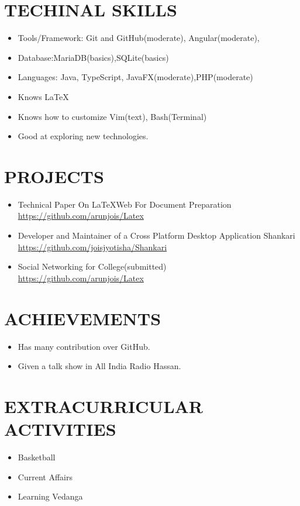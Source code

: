 \documentclass{res}
\begin{document}
\begin{resume}
		\section{TECHINAL SKILLS}
		\begin{itemize}
			\item Tools/Framework: Git and GitHub(moderate),  Angular(moderate),
			\item Database:MariaDB(basics),SQLite(basics)
			\item Languages: Java, TypeScript, JavaFX(moderate),PHP(moderate) 
			\item Knows \LaTeX
			\item Knows how to customize Vim(text), Bash(Terminal)
			\item Good at exploring new technologies.
		\end{itemize}        
		
		
		\section{PROJECTS}
		\begin{itemize}
			\item Technical Paper On \LaTeX Web For Document Preparation \\
			\href {https://github.com/arunjois/Latex}{https://github.com/arunjois/Latex}
			
			\item Developer and Maintainer of a Cross Platform Desktop Application Shankari\\
			\href {https://github.com/joisjotisha/Shankari}{https://github.com/joisjyotisha/Shankari}
			
			\item Social Networking for College(submitted) \\
			\href{https://github.com/arunjois/Latex}{https://github.com/arunjois/Latex}
		\end{itemize}          
		\section{ACHIEVEMENTS}
		\begin{itemize}
			\item Has many contribution over GitHub.
			\item Given a talk show in All India Radio Hassan. 
		\end{itemize} 
		\section{EXTRACURRICULAR ACTIVITIES}
		\begin{itemize}
			\item Basketball
			\item Current Affairs
			\item Learning Vedanga
		\end{itemize}       
		
	\end{resume}
\end{document}
